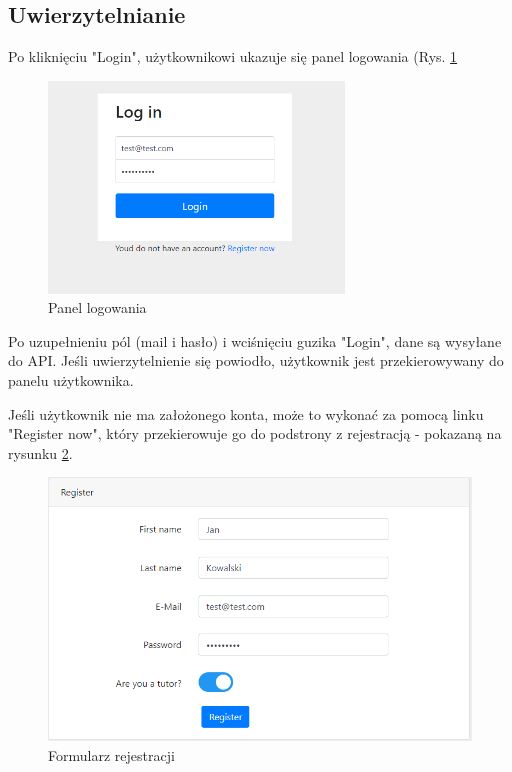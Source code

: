 \documentclass[12pt]{article}
\numberwithin{figure}{section}
\begin{document}
\begin{sloppypar}
\subsection{Uwierzytelnianie}
Po kliknięciu "Login", użytkownikowi ukazuje się panel logowania (Rys. \ref{fig:login}
\begin{figure}[!htbp] 
    \centering
    \includegraphics[width=0.7\textwidth]{images/chapter_4/login.png}
    \caption{Panel logowania}
    \label{fig:login}
\end{figure}

Po uzupełnieniu pól (mail i hasło) i wciśnięciu guzika "Login", dane są wysyłane do API. Jeśli uwierzytelnienie się powiodło, użytkownik jest przekierowywany do panelu użytkownika.

Jeśli użytkownik nie ma założonego konta, może to wykonać za pomocą linku "Register now", który przekierowuje go do podstrony z rejestracją - pokazaną na rysunku \ref{fig:register}.
\begin{figure}[!htbp] 
    \centering
    \includegraphics[width=1\textwidth]{images/chapter_4/register.png}
    \caption{Formularz rejestracji}
    \label{fig:register}
\end{figure}


\end{sloppypar}
\end{document}
